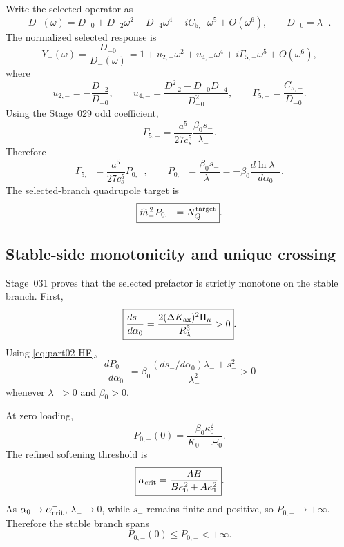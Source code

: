Write the selected operator as
\begin{equation}
D_-(\omega)=D_{-0}+D_{-2}\omega^2+D_{-4}\omega^4-iC_{5,-}\omega^5+O(\omega^6),
\qquad
D_{-0}=\lambda_-.
\end{equation}
The normalized selected response is
\begin{equation}
Y_-(\omega)=\frac{D_{-0}}{D_-(\omega)}
=1+u_{2,-}\omega^2+u_{4,-}\omega^4+i\Gamma_{5,-}\omega^5+O(\omega^6),
\end{equation}
where
\begin{equation}
\label{eq:part02-selected-response-even}
 u_{2,-}=-\frac{D_{-2}}{D_{-0}},
\qquad
u_{4,-}=\frac{D_{-2}^2-D_{-0}D_{-4}}{D_{-0}^2},
\qquad
\Gamma_{5,-}=\frac{C_{5,-}}{D_{-0}}.
\end{equation}
Using the Stage~029 odd coefficient,
\begin{equation}
\Gamma_{5,-}=\frac{a^5}{27c_s^5}\frac{\beta_0s_-}{\lambda_-}.
\end{equation}
Therefore
\begin{equation}
\label{eq:part02-P0-minus}
\boxed{
\Gamma_{5,-}=\frac{a^5}{27c_s^5}P_{0,-},
\qquad
P_{0,-}=\frac{\beta_0s_-}{\lambda_-}
=-\beta_0\frac{d\ln\lambda_-}{d\alpha_0}}.
\end{equation}
The selected-branch quadrupole target is
\begin{equation}
\label{eq:part02-selected-target}
\boxed{
\widehat m_-^{\,2}P_{0,-}=N_Q^{\rm target}}.
\end{equation}

\subsection{Stable-side monotonicity and unique crossing}
\label{subsec:part02-stage031-monotonicity}

Stage~031 proves that the selected prefactor is strictly monotone on the stable branch.  First,
\begin{equation}
\label{eq:part02-ds-dalpha}
\boxed{
\frac{ds_-}{d\alpha_0}
=
\frac{2(\Delta K_{\rm ax})^2\Pi_\kappa}{R_\lambda^3}>0}.
\end{equation}
Using \eqref{eq:part02-HF},
\begin{equation}
\label{eq:part02-dP-dalpha}
\boxed{
\frac{dP_{0,-}}{d\alpha_0}
=
\beta_0
\frac{(ds_-/d\alpha_0)\lambda_-+s_-^2}{\lambda_-^2}>0
}
\end{equation}
whenever \(\lambda_->0\) and \(\beta_0>0\).

At zero loading,
\begin{equation}
\label{eq:part02-Pminus-zero}
P_{0,-}(0)=\frac{\beta_0\kappa_0^2}{K_0-\Xi_0}.
\end{equation}
The refined softening threshold is
\begin{equation}
\label{eq:part02-refined-alpha-crit}
\boxed{
\alpha_{\rm crit}
=
\frac{AB}{B\kappa_0^2+A\kappa_1^2}}.
\end{equation}
As \(\alpha_0\to\alpha_{\rm crit}^{-}\), \(\lambda_-\to0\), while \(s_-\) remains finite and positive, so \(P_{0,-}\to+\infty\).  Therefore the stable branch spans
\begin{equation}
P_{0,-}(0)\leq P_{0,-}<+\infty.
\end{equation}

